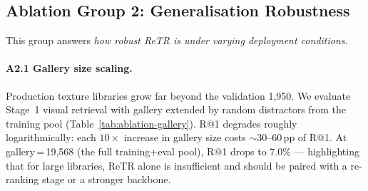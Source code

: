 \documentclass[10pt,twocolumn]{article}
\begin{document}
\begin{table}[h]
\centering
\caption{Architectural ablations on the in-domain benchmark (gallery=1{,}950).}
\label{tab:ablation-arch}
\end{table}

\subsection{Ablation Group 2: Generalisation Robustness}
\label{sec:ablation-gen}

This group answers \emph{how robust ReTR is under varying deployment
conditions}.

\paragraph{A2.1 Gallery size scaling.}
Production texture libraries grow far beyond the validation 1,950.
We evaluate Stage~1 visual retrieval with gallery extended by random
distractors from the training pool (Table~\ref{tab:ablation-gallery}).
R@1 degrades roughly logarithmically: each $10\times$ increase in gallery
size costs $\sim$30--60\,pp of R@1.
At gallery\,=\,19{,}568 (the full training+eval pool), R@1 drops to 7.0\%
--- highlighting that for large libraries, ReTR alone is insufficient and
should be paired with a re-ranking stage or a stronger backbone.

\begin{table}[h]
\centering
\caption{Stage~1 visual retrieval as gallery size grows.
         Distractors are sampled at random from the training pool.}
\label{tab:ablation-gallery}
\end{table}
\end{document}
